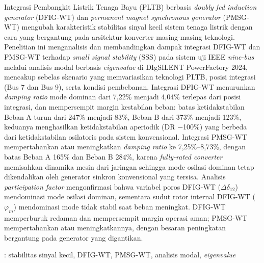 Integrasi Pembangkit Listrik Tenaga Bayu (PLTB) berbasis \textit{doubly fed
induction generator} (DFIG-WT) dan \textit{permanent magnet synchronous
generator} (PMSG-WT) mengubah karakteristik stabilitas sinyal kecil sistem
tenaga listrik dengan cara yang bergantung pada arsitektur konverter
masing-masing teknologi. Penelitian ini menganalisis dan membandingkan dampak
integrasi DFIG-WT dan PMSG-WT terhadap \textit{small signal stability} (SSS)
pada sistem uji IEEE \textit{nine-bus} melalui analisis modal berbasis
\textit{eigenvalue} di DIgSILENT PowerFactory 2024, mencakup sebelas skenario
yang memvariasikan teknologi PLTB, posisi integrasi (Bus 7 dan Bus 9), serta
kondisi pembebanan. Integrasi DFIG-WT menurunkan \textit{damping ratio} mode
dominan dari 7,22\% menjadi 4,04\% terlepas dari posisi integrasi, dan
mempersempit margin kestabilan beban: batas ketidakstabilan Beban A turun dari
247\% menjadi 83\%, Beban B dari 373\% menjadi 123\%, keduanya menghasilkan
ketidakstabilan aperiodik (DR $-$100\%) yang berbeda dari ketidakstabilan
osilatoris pada sistem konvensional. Integrasi PMSG-WT mempertahankan atau
meningkatkan \textit{damping ratio} ke 7,25\%--8,73\%, dengan batas Beban A
165\% dan Beban B 284\%, karena \textit{fully-rated converter} memisahkan
dinamika mesin dari jaringan sehingga mode osilasi dominan tetap dikendalikan
oleh generator sinkron konvensional yang tersisa. Analisis
\textit{participation factor} mengonfirmasi bahwa variabel poros DFIG-WT
($\Delta\delta_{12}$) mendominasi mode osilasi dominan, sementara sudut rotor
internal DFIG-WT ($\varphi_m$) mendominasi mode tidak stabil saat beban
meningkat. DFIG-WT memperburuk redaman dan mempersempit margin operasi aman;
PMSG-WT mempertahankan atau meningkatkannya, dengan besaran peningkatan
bergantung pada generator yang digantikan.

 : stabilitas sinyal kecil, DFIG-WT, PMSG-WT, analisis modal, \textit{eigenvalue}
